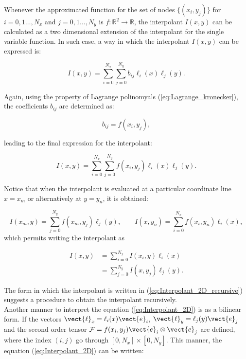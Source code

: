     Whenever the approximated function for the set of nodes $\{(x_i,y_j)\}$ for $i=0,1\ldots , N_x$ and $j=0,1\ldots , N_y$ is $f:\mathbb{R}^2\rightarrow\mathbb{R}$, the interpolant $I(x,y)$ can be calculated as a two dimensional extension of the interpolant for the single variable function. In such case, a way in which the interpolant $I(x,y)$ can be expressed is:
    
    \begin{equation}
     {I}(x,y) = \sum_{i=0}^{N_x} \sum_{j=0}^{N_y} b_{ij} \ell_i(x) \ell_j(y) .
    \end{equation}
    
    Again, using the property of Lagrange polinomyals (\ref{eq:Lagrange_kronecker}), the coefficients $b_{ij}$ are determined as:
    
    \begin{equation}
    	b_{ij}  = f(x_i,y_j),
    \end{equation}
     
     leading to the final expression for the interpolant:
     
     \begin{equation}
     {I}(x,y) = \sum_{i=0}^{N_x} \sum_{j=0}^{N_y} f(x_i,y_j) \ell_i(x) \ell_j(y) .
     \end{equation}
     
     Notice that when the interpolant is evaluated at a particular coordinate line $x=x_m$ or alternatively at $y=y_n$, it is obtained:
     
     \begin{equation}
     	{I}(x_m,y) = \sum_{j=0}^{N_y} f(x_m,y_j)  \ell_j(y) , 
     	\qquad {I}(x,y_n) = \sum_{i=0}^{N_x}  f(x_i,y_n) \ell_i(x)  ,
     	\label{eq:Interpolant_2D}
     \end{equation}
     which permits writing the interpolant as
     
     \begin{align}
     	I(x,y) & = \sum_{i=0}^{N_x} {I}(x_i,y) \ell_i(x) \nonumber \\
     	       & = \sum_{j=0}^{N_y} {I}(x,y_j) \ell_j(y). \label{eq:Interpolant_2D_recursive}
     \end{align}
 
     The form in which the interpolant is written in (\ref{eq:Interpolant_2D_recursive}) suggests a procedure to obtain the interpolant recursively.\\
     
     Another manner to interpret the equation (\ref{eq:Interpolant_2D}) is  as a bilinear form. If the vectors $\vect{\ell}_x = \ell_i(x) \vect{e}_i$, $\vect{\ell}_y = \ell_j(y) \vect{e}_j$ and the second order tensor $\mathcal{F} = f(x_i,y_j) \vect{e}_i  \otimes \vect{e}_j$ are defined, where the index $(i,j)$ go through $[0,N_x]\times[0,N_y]$. This manner, the equation (\ref{eq:Interpolant_2D}) can be written:
     
